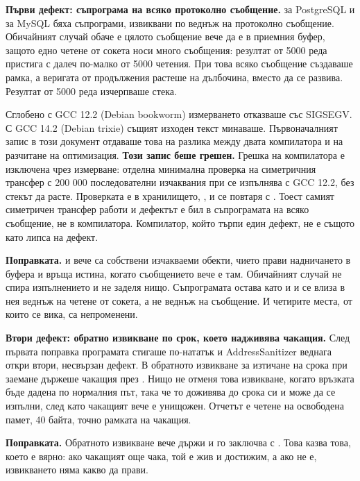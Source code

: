 \textbf{Първи дефект: съпрограма на всяко протоколно съобщение.}  за
PostgreSQL и  за MySQL бяха съпрограми, извиквани по веднъж на протоколно
съобщение. Обичайният случай обаче е цялото съобщение вече да е в приемния буфер, защото едно
четене от сокета носи много съобщения: резултат от 5000 реда пристига с далеч по-малко от 5000
четения. При това всяко съобщение създаваше рамка, а веригата от продължения растеше
на дълбочина, вместо да се развива. Резултат от 5000 реда изчерпваше стека.

Сглобено с GCC 12.2 (Debian bookworm) измерването отказваше със SIGSEGV. С GCC 14.2 (Debian
trixie) същият изходен текст минаваше. Първоначалният запис в този документ отдаваше това на
разлика между двата компилатора и на разчитане на оптимизация. \textbf{Този запис беше
грешен.} Грешка на компилатора е изключена чрез измерване: отделна минимална проверка на
симетричния трансфер с 200 000 последователни изчаквания при  се изпълнява с GCC
12.2, без стекът да расте. Проверката е в хранилището, ,
и се повтаря с . Тоест самият симетричен трансфер работи и дефектът е бил в
съпрограмата на всяко съобщение, не в компилатора. Компилатор, който търпи един дефект, не е
същото като липса на дефект.

\textbf{Поправката.}  и  вече са собствени
изчакваеми обекти, чието  прави надничането в буфера и връща истина,
когато съобщението вече е там. Обичайният случай не спира изпълнението и не заделя нищо.
Съпрограмата остава като  и  и се влиза
в нея веднъж на четене от сокета, а не веднъж на съобщение. И четирите места, от които
 се вика, са непроменени.

\textbf{Втори дефект: обратно извикване по срок, което надживява чакащия.} След първата
поправка програмата стигаше по-нататък и AddressSanitizer веднага откри втори, несвързан
дефект. В  обратното извикване за
изтичане на срока при заемане държеше чакащия през . Нищо не отменя това
извикване, когато връзката бъде дадена по нормалния път, така че то доживява до срока си и
може да се изпълни, след като чакащият вече е унищожен. Отчетът е четене на освободена памет,
40 байта, точно рамката на чакащия.

\textbf{Поправката.} Обратното извикване вече държи  и го
заключва с . Това казва това, което е вярно: ако чакащият още чака, той е жив и
достижим, а ако не е, извикването няма какво да прави.

